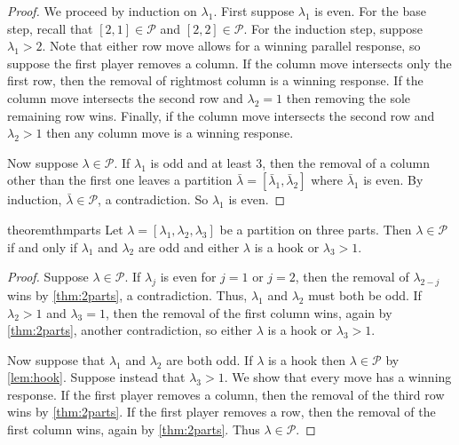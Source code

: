 \documentclass[pdflatex,sn-mathphys-num]{sn-jnl}%
\theoremstyle{thmstyleone}%
\newtheorem{theorem}{Theorem}%
\theoremstyle{thmstyletwo}%
\theoremstyle{thmstylethree}%
\newcommand{\p}{\mathcal P}
\begin{document}
\begin{proof}
    We proceed by induction on $\lambda_1$. First suppose $\lambda_1$ is even. 
    For the base step, recall that $[2,1] \in \p$ and $[2,2] \in \p$. 
    For the induction step, suppose $\lambda_1 > 2$. Note that either row move allows for a winning parallel response, so suppose the first player removes a column. 
    If the column move intersects only the first row, then the removal of rightmost column is a winning response. 
    If the column move intersects the second row and $\lambda_2 = 1$ then removing the sole remaining row wins. 
    Finally, if the column move intersects the second row and $\lambda_2>1$ then any column move is a winning response. 

    Now suppose $\lambda \in \p$. 
    If $\lambda_1$ is odd and at least 3, then the removal of a column other than the first one leaves a partition $\bar \lambda = [\bar \lambda_1, \bar \lambda_2]$ where $\bar \lambda_1$ is even. 
    By induction, $\bar \lambda \in \p$, a contradiction. So $\lambda_1$ is even. 
\end{proof}

\begin{restatable}{theorem}{thmparts} \label{thm:3parts}
    Let $\lambda = [\lambda_1, \lambda_2, \lambda_3]$ be a partition on three parts. 
    Then $\lambda \in \p$ if and only if $\lambda_1$ and $\lambda_2$ are odd and either $\lambda$ is a hook or $\lambda_3 > 1$. 
\end{restatable}
\begin{proof}
    Suppose $\lambda \in \p$. If $\lambda_j$ is even for $j = 1$ or $j = 2$, then the removal of $\lambda_{2-j}$ wins by \cref{thm:2parts}, a contradiction. Thus, $\lambda_1$ and $\lambda_2$ must both be odd. If $\lambda_2 > 1$ and $\lambda_3 = 1$, then the removal of the first column wins, again by \cref{thm:2parts}, another contradiction, so either $\lambda$ is a hook or $\lambda_3 > 1$. 

    Now suppose that $\lambda_1$ and $\lambda_2$ are both odd. If $\lambda$ is a hook then $\lambda \in \p$ by \cref{lem:hook}. Suppose instead that $\lambda_3 > 1$. We show that every move has a winning response. If the first player removes a column, then the removal of the third row wins by \cref{thm:2parts}. If the first player removes a row, then the removal of the first column wins, again by \cref{thm:2parts}. Thus $\lambda \in \p$. 
\end{proof}
\end{document}
